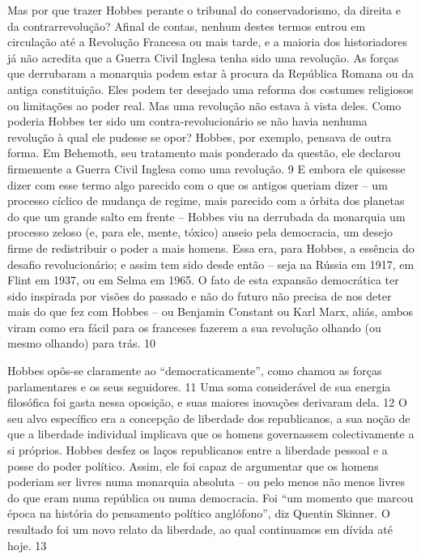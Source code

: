 \par
 
Mas por que trazer Hobbes perante o tribunal do conservadorismo, da direita e da contrarrevolução? Afinal de contas, nenhum destes termos entrou em circulação até a Revolução Francesa ou mais tarde, e a maioria dos historiadores já não acredita que a Guerra Civil Inglesa tenha sido uma revolução. As forças que derrubaram a monarquia podem estar à procura da República Romana ou da antiga constituição. Eles podem ter desejado uma reforma dos costumes religiosos ou limitações ao poder real. Mas uma revolução não estava à vista deles. Como poderia Hobbes ter sido um contra-revolucionário se não havia nenhuma revolução à qual ele pudesse se opor? Hobbes, por exemplo, pensava de outra forma. Em Behemoth, seu tratamento mais ponderado da questão, ele declarou firmemente a Guerra Civil Inglesa como uma revolução.
 {\color{blue} 9}  
E embora ele quisesse dizer com esse termo algo parecido com o que os antigos queriam dizer – um processo cíclico de mudança de regime, mais parecido com a órbita dos planetas do que um grande salto em frente – Hobbes viu na derrubada da monarquia um processo zeloso (e, para ele, mente, tóxico) anseio pela democracia, um desejo firme de redistribuir o poder a mais homens. Essa era, para Hobbes, a essência do desafio revolucionário; e assim tem sido desde então – seja na Rússia em 1917, em Flint em 1937, ou em Selma em 1965. O fato de esta expansão democrática ter sido inspirada por visões do passado e não do futuro não precisa de nos deter mais do que fez com Hobbes – ou Benjamin Constant ou Karl Marx, aliás, ambos viram como era fácil para os franceses fazerem a sua revolução olhando (ou mesmo olhando) para trás.
 {\color{blue} 10}  

 
\par
 
Hobbes opôs-se claramente ao “democraticamente”, como chamou as forças parlamentares e os seus seguidores.
 {\color{blue} 11}  
Uma soma considerável de sua energia filosófica foi gasta nessa oposição, e suas maiores inovações derivaram dela.
 {\color{blue} 12}  
O seu alvo específico era a concepção de liberdade dos republicanos, a sua noção de que a liberdade individual implicava que os homens governassem colectivamente a si próprios. Hobbes desfez os laços republicanos entre a liberdade pessoal e a posse do poder político. Assim, ele foi capaz de argumentar que os homens poderiam ser livres numa monarquia absoluta – ou pelo menos não menos livres do que eram numa república ou numa democracia. Foi “um momento que marcou época na história do pensamento político anglófono”, diz Quentin Skinner. O resultado foi um novo relato da liberdade, ao qual continuamos em dívida até hoje.
 {\color{blue} 13}  

